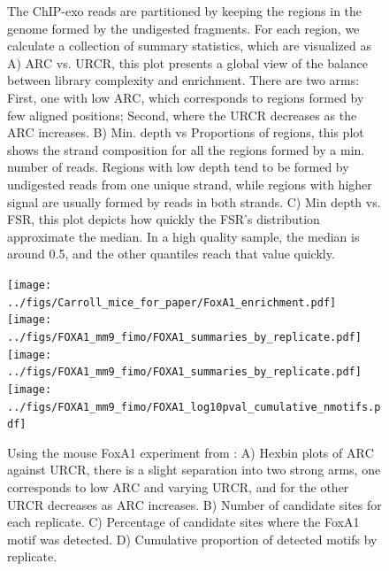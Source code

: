 \documentclass{bmcart}\usepackage[]{graphicx}\usepackage[]{color}
\begin{document}
\begin{figure}[h!]
  \caption{The ChIP-exo reads are partitioned by keeping the regions
    in the genome formed by the undigested fragments. For each region,
    we calculate a collection of summary statistics, which are
    visualized as A) ARC vs. URCR, this plot presents a global view of
    the balance between library complexity and enrichment. There are
    two arms: First, one with low ARC, which corresponds to regions
    formed by few aligned positions; Second, where the URCR decreases
    as the ARC increases. B) Min. depth vs Proportions of regions,
    this plot shows the strand composition for all the regions formed
    by a min. number of reads. Regions with low depth tend to be
    formed by undigested reads from one unique strand, while regions
    with higher signal are usually formed by reads in both strands. C)
    Min depth vs. FSR, this plot depicts how quickly the FSR's
    distribution approximate the median. In a high quality sample, the
    median is around 0.5, and the other quantiles reach that value
    quickly.}
  \label{fig:qcdiagram}
\end{figure}

\newpage

\begin{figure}[h!]
  \centering
  \texttt{[image: ../figs/Carroll\_mice\_for\_paper/FoxA1\_enrichment.pdf]}
  \newline
  \texttt{[image: ../figs/FOXA1\_mm9\_fimo/FOXA1\_summaries\_by\_replicate.pdf]}
  \texttt{[image: ../figs/FOXA1\_mm9\_fimo/FOXA1\_summaries\_by\_replicate.pdf]}
  \texttt{[image: ../figs/FOXA1\_mm9\_fimo/FOXA1\_log10pval\_cumulative\_nmotifs.pdf]}
  \caption{Using the mouse FoxA1 experiment from \cite{exoillumina}:
    A) Hexbin plots of $\mbox{ARC}$ against $\mbox{URCR}$, there is a
    slight separation into two strong arms, one corresponds to low
    $\mbox{ARC}$ and varying $\mbox{URCR}$, and for the other
    $\mbox{URCR}$ decreases as $\mbox{ARC}$ increases. B) Number of
    candidate sites for each replicate. C) Percentage of candidate
    sites where the FoxA1 motif was detected. D) Cumulative
    proportion of detected motifs by replicate.}
  \label{fig:enrich}
\end{figure}
\end{document}
